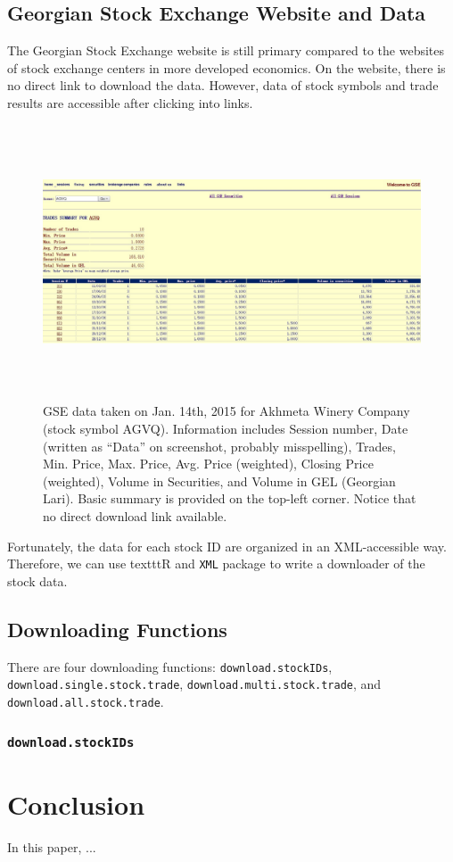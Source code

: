 \documentclass[a4paper]{article}
\begin{document}
\subsection{Georgian Stock Exchange Website and Data}
\label{subsec:GSE}

The Georgian Stock Exchange website is still primary compared to the websites of stock exchange centers in more developed economics. On the website, there is no direct link to download the data. However, data of stock symbols and trade results are accessible after clicking into links.

\begin{figure}[H]
\centering
\includegraphics[width=6.3in, height=3.2in]{images/AGVQ.jpg}
\caption{GSE data taken on Jan. 14th, 2015 for Akhmeta Winery Company (stock symbol AGVQ). Information includes Session number, Date (written as ``Data'' on screenshot, probably misspelling), Trades, Min. Price, Max. Price, Avg. Price (weighted), Closing Price (weighted), Volume in Securities, and Volume in GEL (Georgian Lari). Basic summary is provided on the top-left corner. Notice that no direct download link available.}
\label{fig:AGVQ}
\end{figure}

Fortunately, the data for each stock ID are organized in an XML-accessible way. Therefore, we can use texttt{R} and \texttt{XML} package to write a downloader of the stock data.

\subsection{Downloading Functions}
\label{subsec:functions}
There are four downloading functions: \texttt{download.stockIDs}, \texttt{download.single.stock.trade}, \texttt{download.multi.stock.trade}, and \texttt{download.all.stock.trade}. 

\subsubsection{\texttt{download.stockIDs}}
\label{sssec:download.stockIDs}




\section{Conclusion}

In this paper, ...
\end{document}

